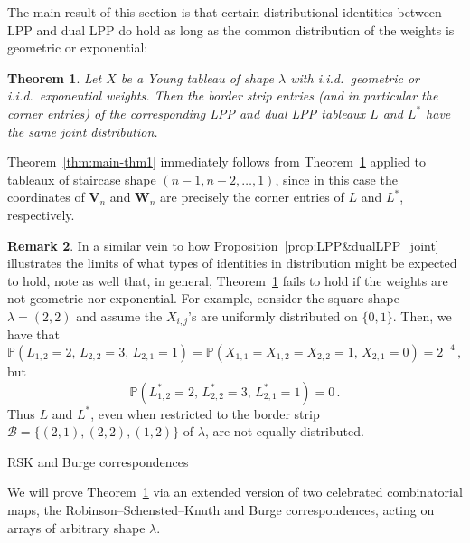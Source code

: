 \documentclass[a4paper,reqno,12pt]{amsart}
\makeatletter
\theoremstyle{plain}
\newtheorem{thm}{Theorem}[section]
\theoremstyle{definition}
\newtheorem{rem}[thm]{Remark}
\renewcommand\subsection{\@startsection{subsection}{2}%
  \z@{.5\linespacing\@plus.7\linespacing}{-.5em}%
  {\bfseries\scshape}}
\renewcommand{\P}{\mathbb{P}}
\newcommand{\1}{\mathbbm{1}}
\newcommand{\Fro}{\mathcal{B}}
\makeatother
\begin{document}
The main result of this section is that certain distributional identities between LPP and dual LPP do hold as long as the common distribution of the weights is geometric or exponential:

\begin{thm}
\label{thm:UpDownLPP}
Let $X$ be a Young tableau of shape $\lambda$ with i.i.d.\ geometric or i.i.d.\ exponential weights.
Then the border strip entries (and in particular the corner entries) of the corresponding LPP and dual LPP tableaux $L$ and $L^*$ have the same joint distribution.
\end{thm}

Theorem~\ref{thm:main-thm1} immediately follows from Theorem~\ref{thm:UpDownLPP} applied to tableaux of staircase shape $(n-1,n-2,\dots,1)$, since in this case the coordinates of $\bm{V}_n$ and $\bm{W}_n$ are precisely the corner entries of $L$ and $L^*$, respectively.

\begin{rem}
In a similar vein to how Proposition~\ref{prop:LPP&dualLPP_joint} illustrates the limits of what types of identities in distribution might be expected to hold, 
note as well that, in general, Theorem~\ref{thm:UpDownLPP} fails to hold if the weights are not geometric nor exponential.
For example, consider the square shape $\lambda=(2,2)$ and assume the $X_{i,j}$'s are uniformly distributed on $\{0,1\}$.
Then, we have that
\[
\P(L_{1,2}=2, \, L_{2,2}=3, \, L_{2,1}=1)
= \P(X_{1,1}=X_{1,2}=X_{2,2}=1, \, X_{2,1}=0)
= 2^{-4} \, ,
\]
but
\[
\P(L^*_{1,2}=2, \, L^*_{2,2}=3, \, L^*_{2,1}=1)
=0 \, .
\]
Thus $L$ and $L^*$, even when restricted to the border strip $\Fro = \{(2,1),(2,2),(1,2)\}$ of $\lambda$, are not equally distributed.
\end{rem}


\subsection{RSK and Burge correspondences}
\label{subsec:RSK&Burge}

We will prove Theorem~\ref{thm:UpDownLPP} via an extended version of two celebrated combinatorial maps, the Robinson--Schensted--Knuth and Burge correspondences, acting on arrays of arbitrary shape $\lambda$.
\end{document}
